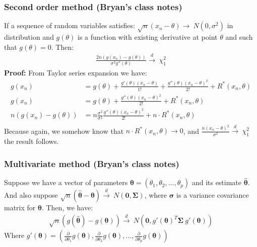 \documentclass[]{article}
\begin{document}
\subsubsection{Second order method (Bryan's class notes)}
If a sequence of random variables satisfies: $\sqrt{n}(x_n - \theta) \rightarrow~N(0, \sigma^2)$ in distribution and $g(\theta)$ is a function with existing derivative at point $\theta$ and such that $g(\theta) = 0$. Then:
$$
\begin{aligned}
	\frac{2n(g(x_n) - g(\theta))}{\sigma^2 g''(\theta)} \overset{d}{\rightarrow}~\chi^2_1
\end{aligned}
$$
\textbf{Proof:} From Taylor series expansion we have:
$$
\begin{aligned}
	g(x_n) &= g(\theta) + \frac{g'(\theta)(x_n - \theta)}{1!} + \frac{g''(\theta)(x_n - \theta)^2}{2!}+ R^*(x_n, \theta)\\
	g(x_n) &= g(\theta)  + \frac{g''(\theta)(x_n - \theta)^2}{2!}+ R^*(x_n, \theta)\\
	n(g(x_n) - g(\theta))  &= n\frac{\sigma^2}{\sigma^2}\frac{g''(\theta)(x_n - \theta)^2}{2!}+ n\cdot R^*(x_n, \theta)\\
\end{aligned}
$$
Because again, we somehow know that $n\cdot R^*(x_n, \theta) \rightarrow 0$, and $	\frac{n(x_n - \theta)^2}{\sigma^2} \overset{d}{\rightarrow}~\chi^2_1$ the result follows.

\subsubsection{Multivariate method (Bryan's class notes)}
Suppose we have a vector of parameters $\pmb{\theta}=(\theta_1, \theta_2, ..., \theta_p)$ and its estimate $\hat{\pmb{\theta}}$.\\ And also suppose $\sqrt{n}(\hat{\pmb{\theta}} - \pmb{\theta}) \overset{d}{\rightarrow}~N(\pmb{0}, \pmb{\Sigma})$, where $\pmb{\sigma}$ is a variance covariance matrix for $\pmb{\theta}$. Then, we have:
$$
\begin{aligned}
	\sqrt{n}(g(\hat{\pmb{\theta}}) - g(\pmb{\theta})) \overset{d}{\rightarrow}~N(\pmb{0}, g'(\pmb{\theta})^T \pmb{\Sigma}~g'(\pmb{\theta}))
\end{aligned}
$$
Where $g'(\pmb{\theta}) = \left( \frac{\partial}{\partial \theta_1} g(\pmb{\theta}), \frac{\partial}{\partial \theta_2} g(\pmb{\theta}), ..., \frac{\partial}{\partial \theta_p} g(\pmb{\theta})  \right)$


\clearpage
\end{document}
